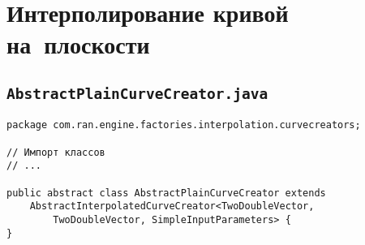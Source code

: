 \chapter{Интерполирование кривой на~плоскости}

\section*{\texttt{AbstractPlainCurveCreator.java}}
\begin{verbatim}
package com.ran.engine.factories.interpolation.curvecreators;

// Импорт классов
// ...

public abstract class AbstractPlainCurveCreator extends
    AbstractInterpolatedCurveCreator<TwoDoubleVector,
        TwoDoubleVector, SimpleInputParameters> {
}
\end{verbatim}

